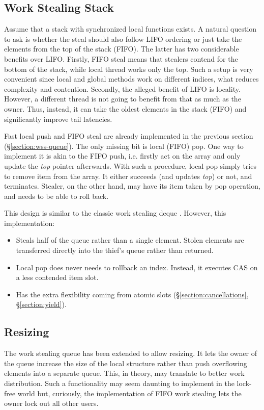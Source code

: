 \documentclass[12pt,a4paper,twoside]{report}
\begin{document}
\subsection{Work Stealing Stack}
Assume that a stack with synchronized local functions exists. A natural question to ask is whether the steal should also follow LIFO ordering or just take the elements from the top of the stack (FIFO). The latter has two considerable benefits over LIFO. Firstly, FIFO steal means that stealers contend for the bottom of the stack, while local thread works only the top. Such a setup is very convenient since local and global methods work on different indices, what reduces complexity and contention. Secondly, the alleged benefit of LIFO is locality. However, a different thread is not going to benefit from that as much as the owner. Thus, instead, it can take the oldest elements in the stack (FIFO) and significantly improve tail latencies. 

Fast local push and FIFO steal are already implemented in the previous section (\S\ref{section:wss-queue}). The only missing bit is local (FIFO) pop. One way to implement it is akin to the FIFO push, i.e. firstly act on the array and only update the \textit{top} pointer afterwards. With such a procedure, local pop simply tries to remove item from the array. It either succeeds (and updates \textit{top}) or not, and terminates. Stealer, on the other hand, may have its item taken by pop operation, and needs to be able to roll back.

This design is similar to the classic work stealing deque \cite{Chase2005}. However, this implementation:
\begin{itemize}
    \item Steals half of the queue rather than a single element. Stolen elements are transferred directly into the thief's queue rather than returned.
    \item Local pop does never needs to rollback an index. Instead, it executes CAS on a less contended item slot.
    \item Has the extra flexibility coming from atomic slots (\S\ref{section:cancellations}, \S\ref{section:yield}).
\end{itemize}

\subsection{Resizing}

The work stealing queue has been extended to allow resizing. It lets the owner of the queue increase the size of the local structure rather than push overflowing elements into a separate queue. This, in theory, may translate to better work distribution. Such a functionality may seem daunting to implement in the lock-free world but, curiously, the implementation of FIFO work stealing lets the owner lock out all other users. 
\end{document}
